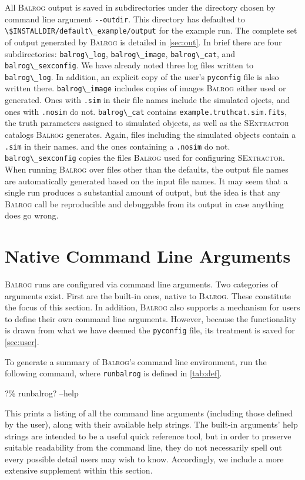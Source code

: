 \documentclass[11pt]{book}
\newcommand{\codett}[1]{\lstinline{#1}}
\newcommand{\pyconfig}{\codett{pyconfig}}
\newcommand{\balrog}{\textsc{Balrog}}
\newcommand{\sex}{\textsc{SExtractor}}
\newcommand{\opt}[1]{\codett{--#1}}
\newcommand{\bcmd}{\% runbalrog}
\begin{document}
All \balrog{} output is saved in subdirectories under the directory chosen by command line argument \opt{outdir}.
This directory has defaulted to \codett{\$INSTALLDIR/default\_example/output} for the example run.
The complete set of output generated by \balrog{} is detailed in \autoref{sec:out}.
In brief there are four subdirectories:
\codett{balrog\_log}, \codett{balrog\_image}, \codett{balrog\_cat}, and \codett{balrog\_sexconfig}.
We have already noted three log files written to \codett{balrog\_log}. In addition, an explicit copy of 
the user's \pyconfig{} file is also written there.
\codett{balrog\_image} includes copies of images \balrog{} either used or generated.
Ones with \codett{.sim} in their file names include the simulated ojects, and ones with \codett{.nosim} do not.
\codett{balrog\_cat} contains \codett{example.truthcat.sim.fits}, the truth parameters assigned to simulated objects,
as well as the \sex{} catalogs \balrog{} generates.
Again, files including the simulated objects contain a \codett{.sim} in their names.
and the ones containing a \codett{.nosim} do not.
\codett{balrog\_sexconfig} copies the files \balrog{} used for configuring \sex{}.
When running \balrog{} over files other than the defaults, 
the output file names are automatically generated based on the input file names.
It may seem that a single run produces a substantial amount of output, but the idea
is that any \balrog{} call be reproducible and debuggable from its output in case anything does go wrong.


\chapter{Native Command Line Arguments}
\label{sec:cmdline}

\balrog{} runs are configured via command line arguments.
Two categories of arguments exist. 
First are the built-in ones, native to \balrog{}.
These constitute the focus of this section.
In addition, \balrog{} also supports a mechanism for users to define their own command line arguments.
However, because the functionality is drawn from what we have deemed the \pyconfig{} file,
its treatment is saved for \autoref{sec:user}.

To generate a summary of \balrog{}'s command line environment, run the following command,
where \codett{runbalrog} is defined in \autoref{tab:def}.
\begin{cmdline}
?\bcmd? --help
\end{cmdline}
This prints a listing of all the command line arguments (including those defined by the user), 
along with their available help strings.
The built-in arguments' help strings are intended to be a useful quick reference tool,
but in order to preserve suitable readability from the command line, 
they do not necessarily spell out every possible detail users may wish to know.
Accordingly, we include a more extensive supplement within this section.
\end{document}
